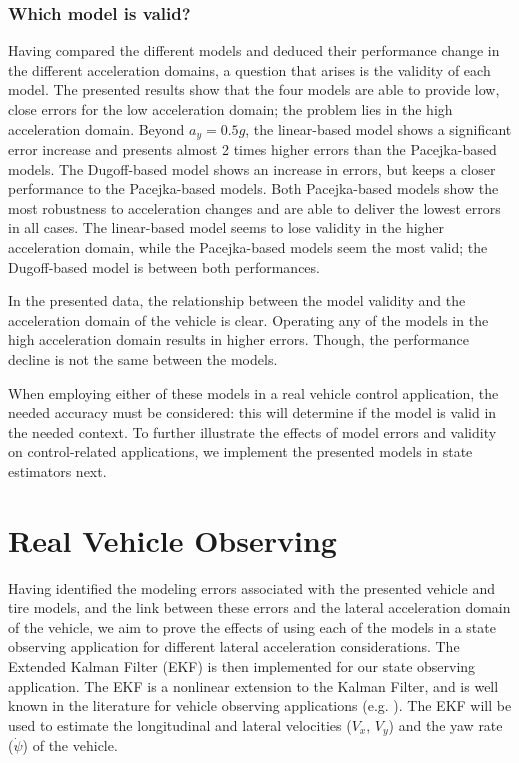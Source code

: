 \documentclass[journal]{IEEEtran}
\begin{document}
\subsubsection{Which model is valid?}
Having compared the different models and deduced their performance change in the different acceleration domains, a question that arises is the validity of each model. The presented results show that the four models are able to provide low, close errors for the low acceleration domain; the problem lies in the high acceleration domain. Beyond $a_y=0.5g$, the linear-based model shows a significant error increase and presents almost 2 times higher errors than the Pacejka-based models. The Dugoff-based model shows an increase in errors, but keeps a closer performance to the Pacejka-based models. Both Pacejka-based models show the most robustness to acceleration changes and are able to deliver the lowest errors in all cases. The linear-based model seems to lose validity in the higher acceleration domain, while the Pacejka-based models seem the most valid; the Dugoff-based model is between both performances.

In the presented data, the relationship between the model validity and the acceleration domain of the vehicle is clear. Operating any of the models in the high acceleration domain results in higher errors. Though, the performance decline is not the same between the models. 

When employing either of these models in a real vehicle control application, the needed accuracy must be considered: this will determine if the model is valid in the needed context. To further illustrate the effects of model errors and validity on control-related applications, we implement the presented models in state estimators next. 

\section{Real Vehicle Observing}\label{realObserving.sec}
Having identified the modeling errors associated with the presented vehicle and tire models, and the link between these errors and the lateral acceleration domain of the vehicle, we aim to prove the effects of using each of the models in a state observing application for different lateral acceleration considerations. The Extended Kalman Filter (EKF) is then implemented for our state observing application. The EKF is a nonlinear extension to the Kalman Filter, and is well known in the literature for vehicle observing applications (e.g. \mbox{\cite{chen_sideslip_2008, hrgetic_vehicle_2014, kim_vehicle_2018, zong_dual_2013})}. The EKF will be used to estimate the longitudinal and lateral velocities ($V_x$, $V_y$) and the yaw rate ($\dot\psi$) of the vehicle.
\end{document}

